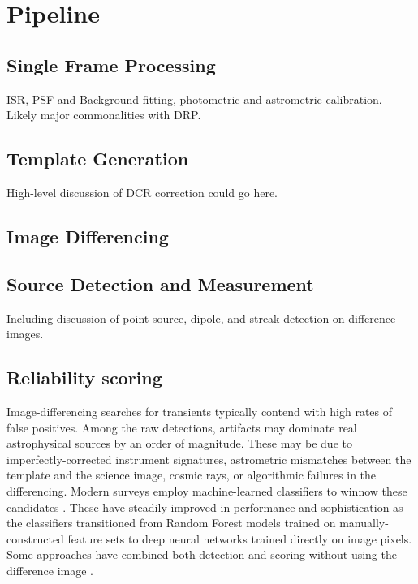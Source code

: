 
\section{Pipeline}


\subsection{Single Frame Processing}


ISR, PSF and Background fitting, photometric and astrometric calibration.  Likely major commonalities with DRP.

\subsection{Template Generation}


High-level discussion of DCR correction could go here.

\subsection{Image Differencing}

\subsection{Source Detection and Measurement}

Including discussion of point source, dipole, and streak detection on difference images.  


\subsection{Reliability scoring}

Image-differencing searches for transients typically contend with high rates of false positives.
Among the raw detections, artifacts may dominate real astrophysical sources by an order of magnitude.
These may be due to imperfectly-corrected instrument signatures, astrometric mismatches between the template and the science image, cosmic rays, or algorithmic failures in the differencing.
Modern surveys employ machine-learned classifiers to winnow these candidates \citep[e.g.,][]{Bailey:07:NearbySNFML,Bloom:12:RealBogus,Brink:13:RB2,Wright:15:PS1ML,Goldstein:15:DESRealBogus,Duev:19:Braii}.
These have steadily improved in performance and sophistication as the classifiers transitioned from Random Forest models trained on manually-constructed feature sets to deep neural networks trained directly on image pixels.
Some approaches have combined both detection and scoring without using the difference image \citep{Sedaghat:17:Transinet,Acero-Cuellar:22:NoDifference}.

